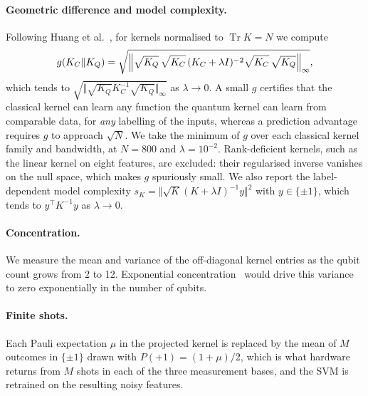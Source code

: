 \documentclass[preprint,11pt]{elsarticle}
\begin{document}
\paragraph{Geometric difference and model complexity.} Following Huang et al.~\cite{huang2021power}, for
kernels normalised to $\operatorname{Tr}K=N$ we compute
\[
g(K_C\Vert K_Q)=\sqrt{\Bigl\Vert\sqrt{K_Q}\,\sqrt{K_C}\,(K_C+\lambda I)^{-2}\sqrt{K_C}\,\sqrt{K_Q}\Bigr\Vert_{\infty}},
\]
which tends to $\sqrt{\Vert\sqrt{K_Q}K_C^{-1}\sqrt{K_Q}\Vert_{\infty}}$ as $\lambda\to 0$. A small $g$
certifies that the classical kernel can learn any function the quantum kernel can learn from comparable
data, for \emph{any} labelling of the inputs, whereas a prediction advantage requires $g$ to approach
$\sqrt{N}$. We take the minimum of $g$ over each classical kernel family and bandwidth, at $N=800$ and
$\lambda=10^{-2}$. Rank-deficient kernels, such as the linear kernel on eight features, are excluded:
their regularised inverse vanishes on the null space, which makes $g$ spuriously small. We also report
the label-dependent model complexity $s_K=\Vert\sqrt{K}(K+\lambda I)^{-1}y\Vert^{2}$ with $y\in\{\pm1\}$,
which tends to $y^{\top}K^{-1}y$ as $\lambda\to 0$.

\paragraph{Concentration.} We measure the mean and variance of the off-diagonal kernel entries as the
qubit count grows from 2 to 12. Exponential concentration~\cite{thanasilp2024concentration} would drive
this variance to zero exponentially in the number of qubits.

\paragraph{Finite shots.} Each Pauli expectation $\mu$ in the projected kernel is replaced by the mean of
$M$ outcomes in $\{\pm1\}$ drawn with $P(+1)=(1+\mu)/2$, which is what hardware returns from $M$ shots in
each of the three measurement bases, and the SVM is retrained on the resulting noisy features.
\end{document}
